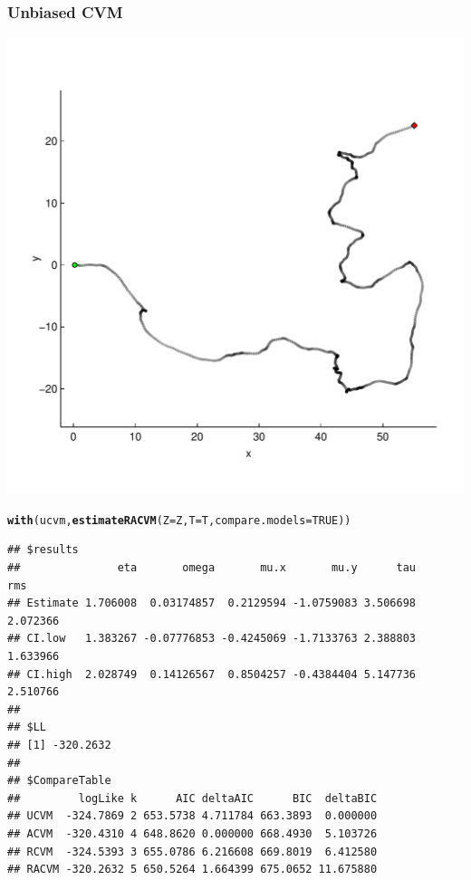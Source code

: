 \documentclass[10pt]{article}\usepackage[]{graphicx}\usepackage[]{color}
\makeatletter
\def\maxwidth{ %
  \ifdim\Gin@nat@width>\linewidth
    \linewidth
  \else
    \Gin@nat@width
  \fi
}
\newcommand{\hlnum}[1]{\textcolor[rgb]{0.686,0.059,0.569}{#1}}%
\newcommand{\hlstd}[1]{\textcolor[rgb]{0.345,0.345,0.345}{#1}}%
\newcommand{\hlkwc}[1]{\textcolor[rgb]{0.333,0.667,0.333}{#1}}%
\newcommand{\hlkwd}[1]{\textcolor[rgb]{0.737,0.353,0.396}{\textbf{#1}}}%
\newenvironment{kframe}{%
 \def\at@end@of@kframe{}%
 \ifinner\ifhmode%
  \def\at@end@of@kframe{\end{minipage}}%
  \begin{minipage}{\columnwidth}%
 \fi\fi%
 \def\FrameCommand##1{\hskip\@totalleftmargin \hskip-\fboxsep
 \colorbox{shadecolor}{##1}\hskip-\fboxsep
     \hskip-\linewidth \hskip-\@totalleftmargin \hskip\columnwidth}%
 \MakeFramed {\advance\hsize-\width
   \@totalleftmargin\z@ \linewidth\hsize
   \@setminipage}}%
 {\par\unskip\endMakeFramed%
 \at@end@of@kframe}
\newenvironment{knitrout}{}{} %
\makeatother
\begin{document}
\subsubsection{Unbiased CVM}
\begin{minipage}{0.4\linewidth}  
\begin{knitrout}
\color{fgcolor}
\includegraphics[width=\maxwidth]{figure/ucvm-1} 

\end{knitrout}
\end{minipage}
\begin{minipage}{0.6\linewidth}
\begin{knitrout}\small
{}\color{fgcolor}\begin{kframe}
\begin{alltt}
\hlkwd{with}\hlstd{(ucvm,} \hlkwd{estimateRACVM}\hlstd{(}\hlkwc{Z}\hlstd{=Z,} \hlkwc{T}\hlstd{=T,} \hlkwc{compare.models}\hlstd{=}\hlnum{TRUE}\hlstd{))}
\end{alltt}
\begin{verbatim}
## $results
##               eta       omega       mu.x       mu.y      tau      rms
## Estimate 1.706008  0.03174857  0.2129594 -1.0759083 3.506698 2.072366
## CI.low   1.383267 -0.07776853 -0.4245069 -1.7133763 2.388803 1.633966
## CI.high  2.028749  0.14126567  0.8504257 -0.4384404 5.147736 2.510766
## 
## $LL
## [1] -320.2632
## 
## $CompareTable
##         logLike k      AIC deltaAIC      BIC  deltaBIC
## UCVM  -324.7869 2 653.5738 4.711784 663.3893  0.000000
## ACVM  -320.4310 4 648.8620 0.000000 668.4930  5.103726
## RCVM  -324.5393 3 655.0786 6.216608 669.8019  6.412580
## RACVM -320.2632 5 650.5264 1.664399 675.0652 11.675880
\end{verbatim}
\end{kframe}
\end{knitrout}
\end{minipage}
\end{document}
